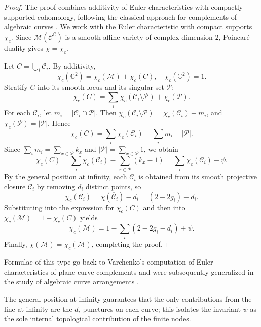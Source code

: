 \documentclass[article,11pt]{amsart} \numberwithin{equation}{section}
\numberwithin{equation}{section}
\begin{document}
{\begin{proof}
	The proof combines additivity of Euler characteristics with compactly supported cohomology, following the classical approach for complements of algebraic curves
	\cite{AndreottiFrankel59,Varchenko82,Randell83,Dimca1992}.
	We work with the Euler characteristic with compact supports $\chi_c$. Since $\mathcal{M}(\mathcal{C}^\mathbb{C})$ is a smooth affine variety of complex dimension $2$, Poincaré duality gives $\chi = \chi_c$.
	
	Let $C = \bigcup_i \mathscr{C}_i$. By additivity,
	\[
	\chi_c(\mathbb{C}^2) = \chi_c(\mathcal{M}) + \chi_c(C),\quad \chi_c(\mathbb{C}^2)=1.
	\]
	Stratify $C$ into its smooth locus and its singular set $\mathcal{P}$:
	\[
	\chi_c(C) = \sum_i \chi_c(\mathscr{C}_i\setminus\mathcal{P}) + \chi_c(\mathcal{P}).
	\]
	For each $\mathscr{C}_i$, let $m_i = |\mathscr{C}_i\cap\mathcal{P}|$. Then $\chi_c(\mathscr{C}_i\setminus\mathcal{P}) = \chi_c(\mathscr{C}_i) - m_i$, and $\chi_c(\mathcal{P}) = |\mathcal{P}|$. Hence
	\[
	\chi_c(C) = \sum_i \chi_c(\mathscr{C}_i) - \sum_i m_i + |\mathcal{P}|.
	\]
	Since $\sum_i m_i = \sum_{x\in\mathcal{P}} k_x$ and $|\mathcal{P}| = \sum_{x\in\mathcal{P}}1$, we obtain
	\[
	\chi_c(C) = \sum_i \chi_c(\mathscr{C}_i) - \sum_{x\in\mathcal{P}}(k_x-1) = \sum_i \chi_c(\mathscr{C}_i) - \psi.
	\]
	By the general position at infinity, each $\mathscr{C}_i$ is obtained from its smooth projective closure $\overline{\mathscr{C}}_i$ by removing $d_i$ distinct points, so
	\[
	\chi_c(\mathscr{C}_i) = \chi(\overline{\mathscr{C}}_i) - d_i = (2-2g_i) - d_i.
	\]
	Substituting into the expression for $\chi_c(C)$ and then into $\chi_c(\mathcal{M}) = 1 - \chi_c(C)$ yields
	\[
	\chi_c(\mathcal{M}) = 1 - \sum_i (2-2g_i-d_i) + \psi.
	\]
	Finally, $\chi(\mathcal{M}) = \chi_c(\mathcal{M})$, completing the proof.
\end{proof}

Formulae of this type go back to Varchenko's computation of Euler characteristics of plane curve complements and were subsequently generalized in the study of algebraic curve arrangements
\cite{Varchenko82,Randell83,Dupont2015,CogolludoMatei2012}.

\begin{rk}
	The general position at infinity guarantees that the only contributions from the line at infinity are the $d_i$ punctures on each curve; this isolates the invariant $\psi$ as the sole internal topological contribution of the finite nodes.
\end{rk}


}
\end{document}
